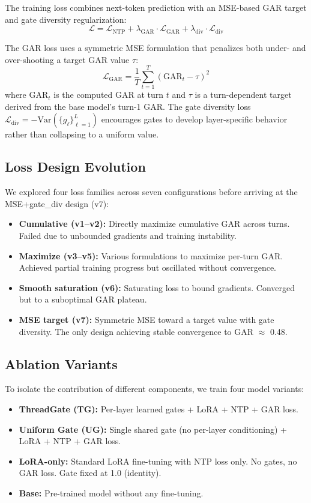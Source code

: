 \documentclass[11pt,a4paper]{article}
\begin{document}
The training loss combines next-token prediction with an MSE-based GAR target and gate diversity regularization:
\begin{equation}
\mathcal{L} = \mathcal{L}_{\text{NTP}} + \lambda_{\text{GAR}} \cdot \mathcal{L}_{\text{GAR}} + \lambda_{\text{div}} \cdot \mathcal{L}_{\text{div}}
\end{equation}

The GAR loss uses a symmetric MSE formulation that penalizes both under- and over-shooting a target GAR value $\tau$:
\begin{equation}
\mathcal{L}_{\text{GAR}} = \frac{1}{T} \sum_{t=1}^{T} (\text{GAR}_t - \tau)^2
\end{equation}
where $\text{GAR}_t$ is the computed GAR at turn $t$ and $\tau$ is a turn-dependent target derived from the base model's turn-1 GAR. The gate diversity loss $\mathcal{L}_{\text{div}} = -\text{Var}(\{g_\ell\}_{\ell=1}^{L})$ encourages gates to develop layer-specific behavior rather than collapsing to a uniform value.

\subsection{Loss Design Evolution}

We explored four loss families across seven configurations before arriving at the MSE+gate\_div design (v7):
\begin{itemize}
\item \textbf{Cumulative (v1--v2):} Directly maximize cumulative GAR across turns. Failed due to unbounded gradients and training instability.
\item \textbf{Maximize (v3--v5):} Various formulations to maximize per-turn GAR. Achieved partial training progress but oscillated without convergence.
\item \textbf{Smooth saturation (v6):} Saturating loss to bound gradients. Converged but to a suboptimal GAR plateau.
\item \textbf{MSE target (v7):} Symmetric MSE toward a target value with gate diversity. The only design achieving stable convergence to GAR $\approx$ 0.48.
\end{itemize}

\subsection{Ablation Variants}

To isolate the contribution of different components, we train four model variants:
\begin{itemize}
\item \textbf{ThreadGate (TG):} Per-layer learned gates + LoRA + NTP + GAR loss.
\item \textbf{Uniform Gate (UG):} Single shared gate (no per-layer conditioning) + LoRA + NTP + GAR loss.
\item \textbf{LoRA-only:} Standard LoRA fine-tuning with NTP loss only. No gates, no GAR loss. Gate fixed at 1.0 (identity).
\item \textbf{Base:} Pre-trained model without any fine-tuning.
\end{itemize}
\end{document}
